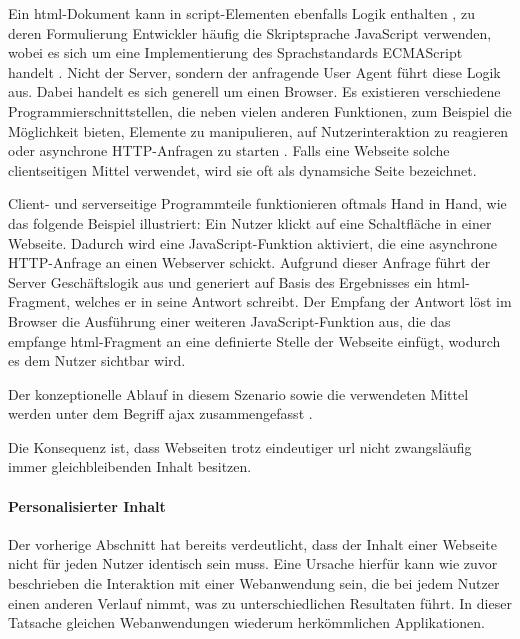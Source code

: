             Ein \gls{html}-Dokument kann in script-Elementen ebenfalls Logik enthalten
            \cite[Kapitel 4.11]{w3c:html5},
            zu deren Formulierung Entwickler häufig die Skriptsprache JavaScript verwenden,
            wobei es sich um eine Implementierung des Sprachstandards ECMAScript handelt
            \cite{ecma:ecmaScript}.
            Nicht der Server, sondern der anfragende User Agent führt diese Logik aus.
            Dabei handelt es sich generell um einen Browser.
            Es existieren verschiedene Programmierschnittstellen,
            die neben vielen anderen Funktionen, zum Beispiel die Möglichkeit bieten,
            Elemente zu manipulieren, auf Nutzerinteraktion zu reagieren
            oder asynchrone HTTP-Anfragen zu starten \cite[Kapitel 8]{whatwg:html}\cite{whatwg:xhr}.
            Falls eine Webseite solche clientseitigen Mittel verwendet,
            wird sie oft als dynamsiche Seite bezeichnet.
            
            Client- und serverseitige Programmteile funktionieren oftmals Hand in Hand,
            wie das folgende Beispiel illustriert:
            Ein Nutzer klickt auf eine Schaltfläche in einer Webseite.
            Dadurch wird eine JavaScript-Funktion aktiviert,
            die eine asynchrone HTTP-Anfrage an einen Webserver schickt.
            Aufgrund dieser Anfrage führt der Server Geschäftslogik aus
            und generiert auf Basis des Ergebnisses ein \gls{html}-Fragment,
            welches er in seine Antwort schreibt.
            Der Empfang der Antwort löst im Browser die Ausführung einer weiteren
            JavaScript-Funktion aus, die das empfange \gls{html}-Fragment
            an eine definierte Stelle der Webseite einfügt,
            wodurch es dem Nutzer sichtbar wird.

            Der konzeptionelle Ablauf in diesem Szenario sowie die verwendeten Mittel
            werden unter dem Begriff \gls{ajax} zusammengefasst \cite{garrett:ajax}.

            Die Konsequenz ist, dass Webseiten trotz eindeutiger \gls{url} nicht zwangsläufig
            immer gleichbleibenden Inhalt besitzen.

            \paragraph*{Personalisierter Inhalt}
            Der vorherige Abschnitt hat bereits verdeutlicht,
            dass der Inhalt einer Webseite nicht für jeden Nutzer identisch sein muss.
            Eine Ursache hierfür kann wie zuvor beschrieben die Interaktion mit
            einer Webanwendung sein, die bei jedem Nutzer einen anderen Verlauf nimmt,
            was zu unterschiedlichen Resultaten führt.
            In dieser Tatsache gleichen Webanwendungen wiederum herkömmlichen Applikationen.

